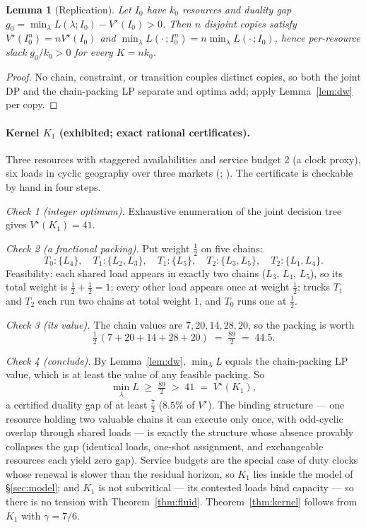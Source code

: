 \documentclass[11pt]{article}
\newtheorem{lemma}{Lemma}
\newcommand{\Vstar}{V^{\star}}
\begin{document}
\begin{lemma}[Replication]
\label{lem:replication}
Let $I_0$ have $k_0$ resources and duality gap
$g_0 = \min_{\lambda} L(\lambda; I_0) - \Vstar(I_0) > 0$. Then $n$
disjoint copies satisfy $\Vstar(I_0^n) = n \Vstar(I_0)$ and
$\min_{\lambda} L(\cdot\,; I_0^n) = n \min_{\lambda} L(\cdot\,; I_0)$,
hence per-resource slack $g_0 / k_0 > 0$ for every $K = n k_0$.
\end{lemma}

\begin{proof}
No chain, constraint, or transition couples distinct copies, so both the
joint DP and the chain-packing LP separate and optima add; apply
Lemma~\ref{lem:dw} per copy.
\end{proof}

\paragraph{Kernel $K_1$ (exhibited; exact rational certificates).}
Three resources with staggered availabilities and service budget 2 (a
clock proxy), six loads in cyclic geography over three markets
(; ).
The certificate is checkable by hand in four steps.

\emph{Check 1 (integer optimum).} Exhaustive enumeration of the joint
decision tree gives $\Vstar(K_1) = 41$.

\emph{Check 2 (a fractional packing).} Put weight $\tfrac{1}{2}$ on
five chains:
\[
  T_0{:}\{L_4\},\quad T_1{:}\{L_2, L_3\},\quad T_1{:}\{L_5\},\quad
  T_2{:}\{L_3, L_5\},\quad T_2{:}\{L_1, L_4\}.
\]
Feasibility: each shared load appears in exactly two chains
($L_3$, $L_4$, $L_5$), so its total weight is
$\tfrac{1}{2} + \tfrac{1}{2} = 1$; every other load appears once at
weight $\tfrac{1}{2}$; trucks $T_1$ and $T_2$ each run two chains at
total weight $1$, and $T_0$ runs one at $\tfrac{1}{2}$.

\emph{Check 3 (its value).} The chain values are $7, 20, 14, 28, 20$,
so the packing is worth
\[
  \tfrac{1}{2}\,(7 + 20 + 14 + 28 + 20) \;=\; \tfrac{89}{2}
  \;=\; 44.5.
\]

\emph{Check 4 (conclude).} By Lemma~\ref{lem:dw},
$\min_{\lambda} L$ equals the chain-packing LP value, which is at
least the value of any feasible packing. So
\[
  \min_{\lambda} L \;\geq\; \tfrac{89}{2} \;>\; 41 \;=\; \Vstar(K_1),
\]
a certified duality gap of at least $\tfrac{7}{2}$ ($8.5\%$ of
$\Vstar$). The binding structure ---
one resource holding two valuable chains it can execute only once, with
odd-cyclic overlap through shared loads --- is exactly the structure
whose absence provably collapses the gap (identical loads, one-shot
assignment, and exchangeable resources each yield zero gap).
Service budgets are the special case of duty clocks whose renewal is
slower than the residual horizon, so $K_1$ lies inside the model of
\S\ref{sec:model}; and $K_1$ is not subcritical --- its contested loads
bind capacity --- so there is no tension with
Theorem~\ref{thm:fluid}. Theorem~\ref{thm:kernel} follows from $K_1$
with $\gamma = 7/6$.
\end{document}

